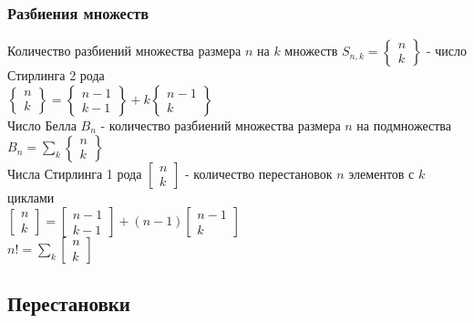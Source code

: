 \documentclass[12pt]{article}
\begin{document}
\subsubsection{Разбиения множеств}
Количество разбиений множества размера $n$ на $k$ множеств $S_{n,k} = \begin{Bmatrix} n\\k\end{Bmatrix}$ - число Стирлинга 2 рода\\
$\begin{Bmatrix} n\\k\end{Bmatrix} = \begin{Bmatrix} n-1\\k-1\end{Bmatrix} + k\begin{Bmatrix} n-1\\k\end{Bmatrix}$\\
Число Белла $B_n$ - количество разбиений множества размера $n$ на подмножества\\
$B_n = \sum_{k}\begin{Bmatrix} n\\k\end{Bmatrix}$\\
Числа Стирлинга 1 рода $\begin{bmatrix} n\\k\end{bmatrix}$ - количество перестановок $n$ элементов с $k$ циклами\\
$\begin{bmatrix} n\\k\end{bmatrix} = \begin{bmatrix} n-1\\k-1\end{bmatrix} + (n-1)\begin{bmatrix} n-1\\k\end{bmatrix}$\\
$n! = \sum_{k}\begin{bmatrix} n\\k\end{bmatrix}$
\subsection{Перестановки}
\end{document}

